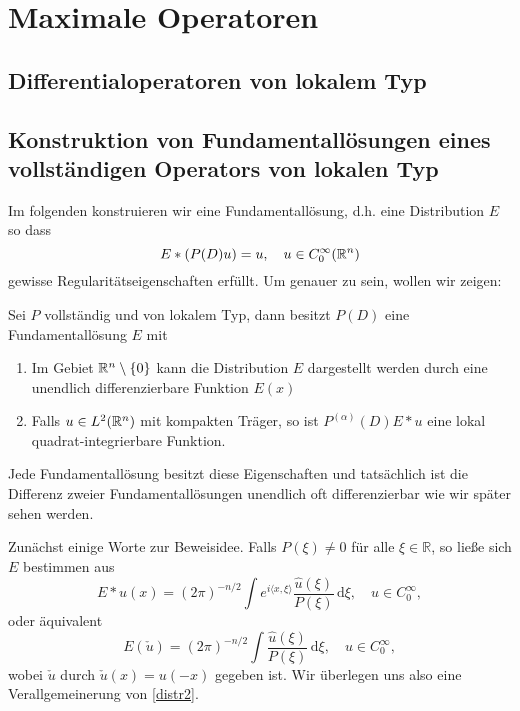 \chapter{Maximale Operatoren}

\section{Differentialoperatoren von lokalem Typ} %


\section{Konstruktion von Fundamentallösungen eines vollständigen Operators von lokalen Typ} %

Im folgenden konstruieren wir eine Fundamentallösung, d.h. eine Distribution $E$ so dass
\begin{equation}
E*(P(D) u) = u, \quad u \in C_0^\infty(\mathbb R^n)
\end{equation}
gewisse Regularitätseigenschaften erfüllt.
Um genauer zu sein,  wollen wir zeigen:
\begin{thm}\label{fundamental_exist}
Sei $P$ vollständig und von lokalem Typ, dann besitzt $P(D)$ eine Fundamentallösung $E$ mit 
\begin{enumerate}
\item Im Gebiet $\mathbb R^n\setminus\{0\}$ kann die Distribution $E$
dargestellt werden durch eine unendlich differenzierbare Funktion $E(x)$
\item Falls $u\in L^2(\mathbb R^n)$ mit kompakten Träger, so ist $P^{(\alpha)}(D) E*u$ eine lokal quadrat-integrierbare Funktion. 
\end{enumerate}
\end{thm}
\begin{rem}
Jede Fundamentallösung besitzt diese Eigenschaften und tatsächlich ist die Differenz zweier Fundamentallösungen unendlich oft differenzierbar wie wir später sehen werden.
\end{rem}

Zunächst einige Worte zur Beweisidee.  Falls $P(\xi)\neq 0$ für alle $\xi\in \mathbb R$, so ließe sich $E$ bestimmen aus
\begin{equation}\label{distr1}
E*u(x) = (2\pi)^{-n/2}\int e^{i\langle x, \xi \rangle} \frac{\hat u(\xi)}{P(\xi)}\, \mathrm d\xi, \quad u \in C_0^\infty,
\end{equation}
oder äquivalent
\begin{equation}\label{distr2}
E(\check u)= (2\pi)^{-n/2} \int \frac{\hat u(\xi)}{P(\xi)}\, \mathrm d\xi, \quad u \in C_0^\infty,
\end{equation}
wobei $\check u$ durch $\check u(x)=u(-x)$ gegeben ist. Wir überlegen uns also eine Verallgemeinerung von \ref{distr2}.

